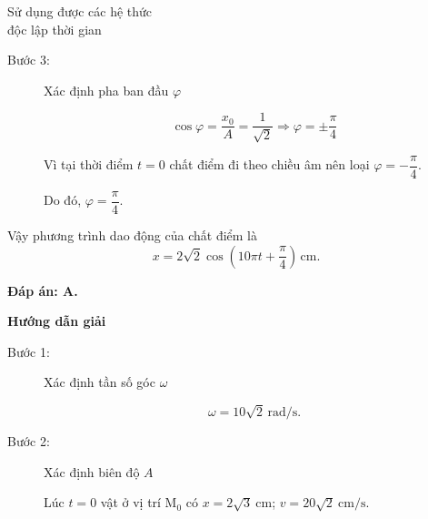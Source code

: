 \begin{dang}{Sử dụng được các hệ thức\\ độc lập thời gian}
{\begin{description}
			\item[Bước 3:] Xác định pha ban đầu $\varphi$
			
			\begin{equation*}
				\cos\varphi =\dfrac{x_{0}}{A}=\frac{1}{\sqrt{2}}\Rightarrow\varphi =\pm\dfrac{\pi }{4}
			\end{equation*}
			
			Vì tại thời điểm $t=0$ chất điểm đi theo chiều âm nên loại $\varphi =-\dfrac{\pi }{4}$.
			
			Do đó, $\varphi =\dfrac{\pi }{4}$.
		\end{description}
		
		Vậy phương trình dao động của chất điểm là
		\begin{equation*}
			x=2\sqrt{2}\cos\left(10\pi t+\dfrac{\pi }{4} \right)\,\text{cm}.
		\end{equation*}
		
		\textbf{Đáp án: A.}
	}
	
	{\begin{center}
			\textbf{Hướng dẫn giải}
		\end{center}
		
		\begin{description}
			\item[Bước 1:] Xác định tần số góc $\omega$
			
			\begin{equation*}
				\omega =10\sqrt 2 \,\text{rad/s}.
			\end{equation*}
			
			\item[Bước 2:] Xác định biên độ $A$
			
			Lúc $t=0$ vật ở vị trí M$_0$ có $x=2\sqrt 3\ \text{cm}$; $v=20\sqrt 2\ \text{cm/s}$.
			

\end{description}}
\end{dang}
